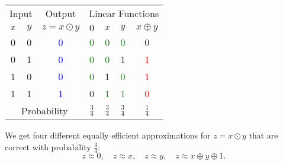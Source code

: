 \begin{center}
\begin{minipage}{.48\textwidth}\centering
{}
\end{minipage}
\begin{minipage}{.48\textwidth}\centering
	\renewcommand{\arraystretch}{1.25}
	\begin{tabular}{cc|c|cccc}
		\toprule[1.2pt]
		\multicolumn{2}{c|}{Input} & Output &
		\multicolumn{4}{c}{Linear Functions} \\
		$x$ & $y$ & $z=x\odot y$ & $0$ & $x$ & $y$ & $x\oplus y$\\
		\hline
		0 & 0 & \textcolor{blue}{0} & \textcolor{green}{0} & \textcolor{green}{0} & \textcolor{green}{0} & 0 \\
		0 & 1 & \textcolor{blue}{0} & \textcolor{green}{0} & \textcolor{green}{0} & 1 & \textcolor{red}{1} \\
		1 & 0 & \textcolor{blue}{0} & \textcolor{green}{0} & 1 & \textcolor{green}{0} & \textcolor{red}{1} \\
		1 & 1 & \textcolor{blue}{1} & 0 & \textcolor{green}{1} & \textcolor{green}{1} & \textcolor{red}{0} \\
		\hline
		\multicolumn{3}{c|}{Probability} &
		$\frac{3}{4}$ &
		$\frac{3}{4}$ &
		$\frac{3}{4}$ &
		$\frac{1}{4}$ \\
		\bottomrule[1.2pt]
	\end{tabular}
\end{minipage}
\end{center}

We get four different equally efficient approximations for $z=x\odot y$ that are correct with probability $\frac{3}{4}$: \[
z\approx 0,\quad z\approx x,\quad z\approx y,\quad z\approx x\oplus y\oplus 1.
\] 

\newpage
